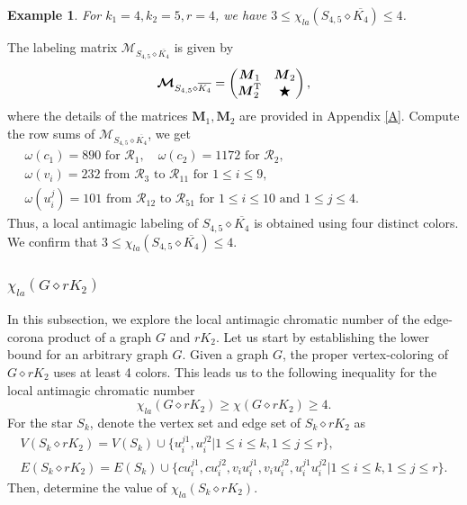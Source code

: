 \documentclass[12pt]{article}
\newtheorem{example}{Example}[section]
\begin{document}
\begin{example}\label{E2}
{For $k_{1}=4,k_{2}=5,r=4$, we have $3\leq\chi_{la}(S_{4,5}\diamond \overline{K_{4}})\leq 4$.}
\end{example}
The labeling matrix $\boldsymbol{\mathcal{M}}_{S_{4,5}\diamond \overline{K_{4}}}$ is given by
\begin{equation*}
\boldsymbol{\mathcal{M}}_{S_{4,5}\diamond \overline{K_{4}}}=
\begin{pmatrix}
	\boldsymbol{M}_{1} & \boldsymbol{M}_{2}\\
	\boldsymbol{M}_{2}^{\rm{T}} &\bigstar
\end{pmatrix},
\end{equation*}
where the details of the matrices $\boldsymbol{M}_{1},\boldsymbol{M}_{2}$ are provided in Appendix \ref{A}. Compute the row sums of $\boldsymbol{\mathcal{M}}_{S_{4,5}\diamond \overline{K_{4}}}$, we get
\begin{equation*}
\begin{array}{l}
\quad\omega(c_{1})=890 \text{ for $\mathcal{R}_{1}$},\quad\omega(c_{2})=1172 \text{ for $\mathcal{R}_{2}$},\\[4pt]
\quad\omega(v_{i})=232 \text{ from $\mathcal{R}_{3}$ to $\mathcal{R}_{11}$ for $1\leq i\leq 9$}, \\[4pt]
\quad\omega(u_{i}^{j})=101 \text{ from $\mathcal{R}_{12}$ to $\mathcal{R}_{51}$ for $1\leq i\leq 10$ and $1\leq j\leq 4$}.\quad\quad\quad\quad\quad\quad\quad\quad\quad\quad\quad\quad\quad\quad\quad
\end{array}
\end{equation*}
Thus, a local antimagic labeling of $S_{4,5}\diamond \overline{K_{4}}$ is obtained using four distinct colors. We confirm that $3\leq\chi_{la}(S_{4,5}\diamond \overline{K_{4}})\leq 4$.

\subsubsection{$\chi_{la}(G\diamond rK_{2})$}%

In this subsection, we explore the local antimagic chromatic number of the edge-corona product of a graph $G$ and $rK_{2}$. Let us start by establishing the lower bound for an arbitrary graph $G$.
Given a graph $G$, the proper vertex-coloring of $G\diamond rK_{2}$ uses at least 4 colors. This leads us to the following inequality for the local antimagic chromatic number
$$\chi_{la}(G\diamond rK_{2})\geq \chi(G\diamond rK_{2})\geq4.$$
For the star $S_{k}$, denote the vertex set and edge set of $S_{k}\diamond rK_{2}$ as
\begin{equation*}
  \begin{array}{c}%
      V(S_{k}\diamond rK_{2})=V(S_{k})\cup \{u_{i}^{j1},u_{i}^{j2}|1\leq i\leq k,1\leq j\leq r\}, \\[4pt]
      E(S_{k}\diamond rK_{2})=E(S_{k})\cup \{cu_{i}^{j1},cu_{i}^{j2},v_{i}u_{i}^{j1},v_{i}u_{i}^{j2},u_{i}^{j1}u_{i}^{j2}|1\leq i\leq k,1\leq j\leq r\}.
  \end{array}
\end{equation*}
Then, determine the value of $\chi_{la}(S_{k}\diamond rK_{2})$.
\end{document}

